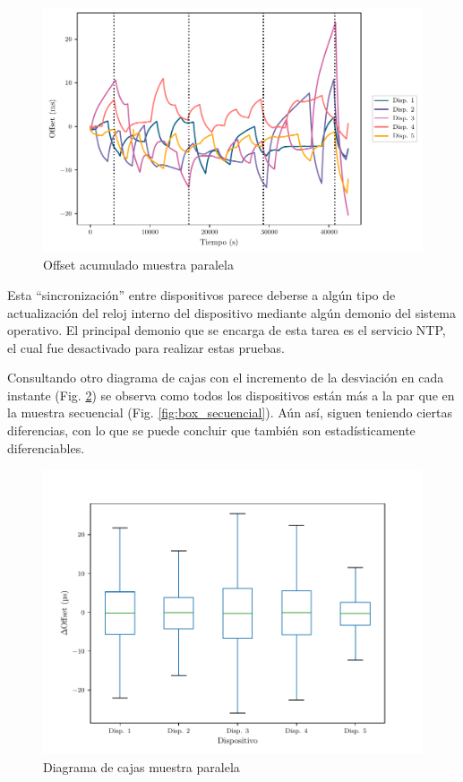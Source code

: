 \begin{figure}
    \centering
    \includegraphics{../Python/plots/parallel/offset_plot}
    \caption{Offset acumulado muestra paralela}
    \label{fig:off_acu_paralelo}
\end{figure}

Esta ``sincronización'' entre dispositivos parece deberse a algún tipo de actualización del reloj interno del dispositivo mediante algún demonio del sistema operativo. El principal demonio que se encarga de esta tarea es el servicio NTP, el cual fue desactivado para realizar estas pruebas. 

Consultando otro diagrama de cajas con el incremento de la desviación en cada instante (Fig. \ref{fig:box_paralelo}) se observa como todos los dispositivos están más a la par que en la muestra secuencial (Fig. \ref{fig:box_secuencial}). Aún así, siguen teniendo ciertas diferencias, con lo que se puede concluir que también son estadísticamente diferenciables.

\begin{figure}
    \centering
    \includegraphics{../Python/plots/parallel/boxplot_no_out}
    \caption{Diagrama de cajas muestra paralela}
    \label{fig:box_paralelo}
\end{figure}

